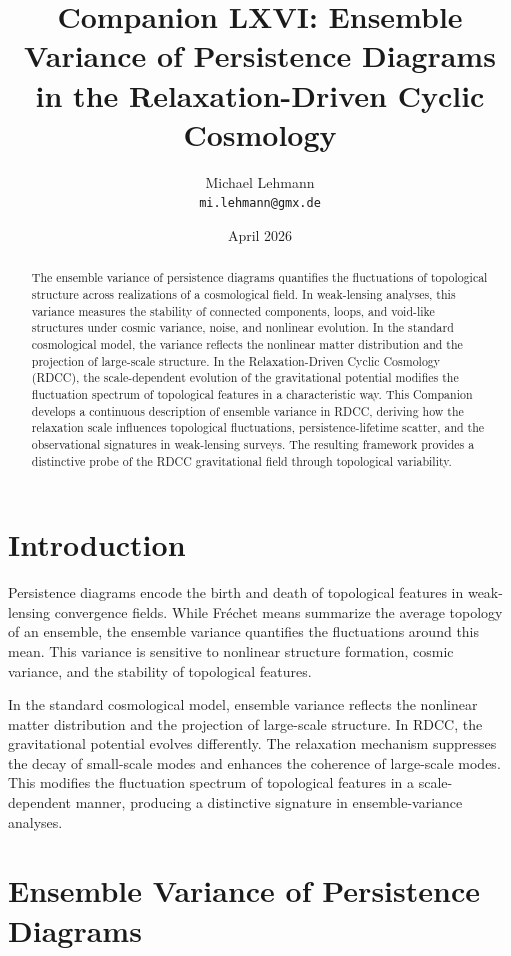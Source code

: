 \documentclass[11pt,a4paper]{article}
\title{\textbf{Companion LXVI: Ensemble Variance of Persistence Diagrams in the Relaxation-Driven Cyclic Cosmology}}
\author{Michael Lehmann \\ \texttt{mi.lehmann@gmx.de}}
\date{April 2026}
\begin{document}
\maketitle

\begin{abstract}
The ensemble variance of persistence diagrams quantifies the fluctuations of 
topological structure across realizations of a cosmological field. In weak-lensing 
analyses, this variance measures the stability of connected components, loops, and 
void-like structures under cosmic variance, noise, and nonlinear evolution. In the 
standard cosmological model, the variance reflects the nonlinear matter 
distribution and the projection of large-scale structure. In the Relaxation-Driven 
Cyclic Cosmology (RDCC), the scale-dependent evolution of the gravitational 
potential modifies the fluctuation spectrum of topological features in a 
characteristic way. This Companion develops a continuous description of ensemble 
variance in RDCC, deriving how the relaxation scale influences topological 
fluctuations, persistence-lifetime scatter, and the observational signatures in 
weak-lensing surveys. The resulting framework provides a distinctive probe of the 
RDCC gravitational field through topological variability.
\end{abstract}
\section{Introduction}

Persistence diagrams encode the birth and death of topological features in 
weak-lensing convergence fields. While Fréchet means summarize the average 
topology of an ensemble, the ensemble variance quantifies the fluctuations around 
this mean. This variance is sensitive to nonlinear structure formation, cosmic 
variance, and the stability of topological features.

In the standard cosmological model, ensemble variance reflects the nonlinear matter 
distribution and the projection of large-scale structure. In RDCC, the 
gravitational potential evolves differently. The relaxation mechanism suppresses 
the decay of small-scale modes and enhances the coherence of large-scale modes. 
This modifies the fluctuation spectrum of topological features in a scale-dependent 
manner, producing a distinctive signature in ensemble-variance analyses.
\section{Ensemble Variance of Persistence Diagrams}
\end{document}
